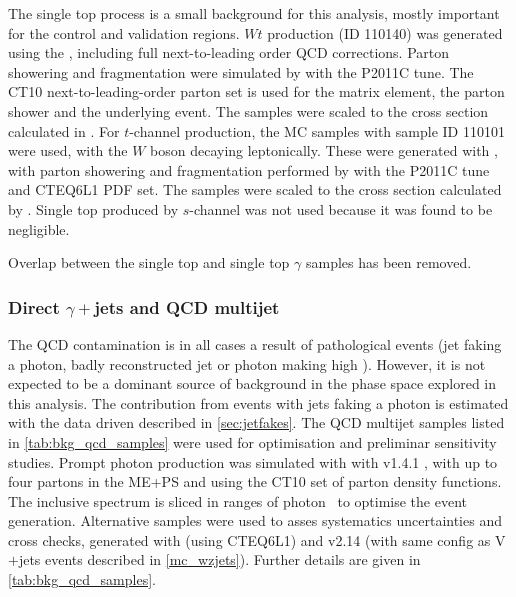 The single top process is a small background for this analysis, mostly
important for the control and validation regions. $Wt$ production (ID 110140) was generated using the \powheg, including full next-to-leading order QCD
corrections. Parton showering and fragmentation were simulated by
\pythia with the P2011C tune. The CT10 next-to-leading-order parton
set is used for the matrix element, the parton shower and the
underlying event. The samples were scaled to the cross section
calculated in \cite{Kidonakis:2010ux}. For $t$-channel
production, the MC samples with sample ID 110101 were used, with the
$W$ boson decaying leptonically. These were generated with
\acermc \cite{acer}, with parton showering and fragmentation performed
by {\pythia} with the P2011C tune and CTEQ6L1 PDF set.  The samples were
scaled to the cross section calculated by \cite{Kidonakis:2011wy}.
Single top produced by $s$-channel was not used because it was found
to be negligible.

Overlap between the single top and single top $\gamma$ samples has been removed.

\subsubsection{Direct $\gamma+$jets and QCD multijet}


The QCD contamination is in all cases a result of pathological events
(jet faking a photon, badly reconstructed jet or photon making high \MET).
However, it is not expected to be a dominant source of background in the
phase space explored in this analysis. The contribution from events with
jets faking a photon is estimated with the data driven described in
{\Sec} \ref{sec:jetfakes}. The QCD multijet samples listed in {\tab}
\ref{tab:bkg_qcd_samples} were used for optimisation and preliminar
sensitivity studies. Prompt photon production was simulated with
with {\sherpa} v1.4.1 \cite{SherpaGen}, with up to four partons in the ME+PS
and using the CT10 set of parton density functions. The inclusive spectrum
is sliced in ranges of photon \pt\ to optimise the event generation.
Alternative samples were used to asses systematics uncertainties and
cross checks, generated with {\pythiaeight} (using CTEQ6L1) and {\alpgen}
v2.14 (with same config as V$+$jets events described in {\Sec} \ref{mc_wzjets}).
Further details are given in {\tab} \ref{tab:bkg_qcd_samples}.

